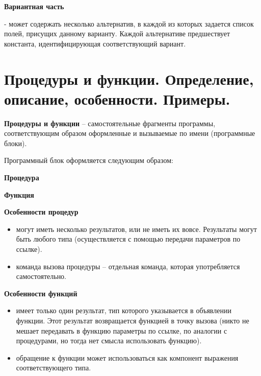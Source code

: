 {\bf{Вариантная часть}}


- может содержать несколько альтернатив, в каждой из которых задается список полей, присущих данному варианту. Каждой альтернативе предшествует константа, идентифицирующая соответствующий вариант.






\newpage\section{Процедуры и функции. Определение, описание, особенности. Примеры. }

\begin{myquote}
            
\end{myquote}

{\bf{Процедуры и функции}} – самостоятельные фрагменты программы, соответствующим образом оформленные и вызываемые по имени (программные блоки).

Программный блок оформляется следующим образом:

{\bf{Процедура}}

{\bf{Функция}}

{\bf{Особенности процедур}}

\begin{itemize}
\item могут иметь несколько результатов, или не иметь их вовсе. Результаты могут быть любого типа (осуществляется с помощью передачи параметров по ссылке).

\item команда вызова процедуры – отдельная команда, которая употребляется самостоятельно.
\end{itemize}

{\bf{Особенности функций}}
\begin{itemize}

\item имеет только один результат, тип которого указывается в объявлении функции. Этот результат возвращается функцией в точку вызова (никто не мешает передавать в функцию параметры по ссылке, по аналогии с процедурами, но тогда нет смысла использовать функцию).

\item обращение к функции может использоваться как компонент выражения соответствующего типа.
\end{itemize}



